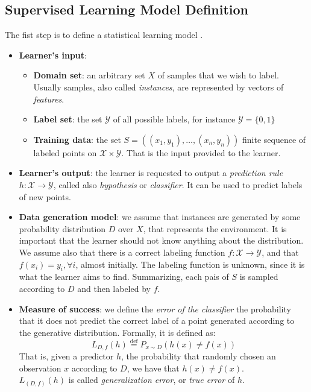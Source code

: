 \subsection{Supervised Learning Model Definition}
The fist step is to define a statistical learning model \cite{Shalev-Shwartz:2014:UML:2621980}.
\begin{itemize}
	\item \textbf{Learner's input}: 
	\begin{itemize}
		\item \textbf{Domain set}: an arbitrary set $X$ of samples that we wish to label. Usually samples, also called \textit{instances}, are represented by vectors of \textit{features}.
		\item \textbf{Label set}: the set $\mathcal{Y}$ of all possible labels, for instance $\mathcal{Y}=\{0,1\}$
		\item \textbf{Training data}: the set $S=((x_1,y_1), \dots, (x_n,y_n))$ finite sequence of labeled points on $\mathcal{X} \times \mathcal{Y}$. That is the input provided to the learner.
	\end{itemize}

	\item \textbf{Learner's output}: the learner is requested to output a \textit{prediction rule} $h: \mathcal{X} \rightarrow \mathcal{Y}$, called also \textit{hypothesis} or \textit{classifier}. It can be used to predict labels of new points.
	
	\item \textbf{Data generation model}: we assume that instances are generated by some probability distribution $D$ over $X$, that represents the environment. It is important that the learner should not know anything about the distribution. We assume also that there is a correct labeling function $f: \mathcal{X} \rightarrow \mathcal{Y}$, and that $f(x_i) = y_i, \forall i$, almost initially. The labeling function is unknown, since it is what the learner aims to find. Summarizing, each pais of $S$ is sampled according to $D$ and then labeled by $f$.
	
	\item  \textbf{Measure of success}: we define the \textit{error of the classifier} the probability that it does not predict the correct label of a point generated according to the generative distribution. Formally, it is defined as:
	\[L_{D,f}(h) \stackrel{\text{def}}{=} P_{x \sim D}(h(x) \neq f(x)) \]
	That is, given a predictor $h$, the probability that randomly chosen an observation $x$ according to $D$, we have that $h(x) \neq f(x)$.\\
	$L_{(D,f)}(h)$ is called \textit{generalization error}, or \textit{true error} of $h$.
	
\end{itemize}


